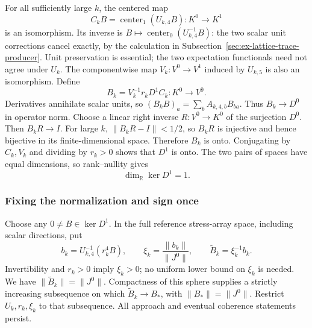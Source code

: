 For all sufficiently large $k$, the centered map
\[
 C_kB=\operatorname{center}_1(U_{k,4}B):K^0\longrightarrow K^1
\]
is an isomorphism. Its inverse is
$B\mapsto\operatorname{center}_0(U_{k,4}^{-1}B)$: the two scalar
unit corrections cancel exactly, by the calculation in
Subsection~\ref{sec:ex-lattice-trace-producer}. Unit preservation is
essential; the two expectation functionals need not agree under $U_k$.
The componentwise map $V_k:V^0\to V^1$ induced by $U_{k,5}$ is
also an isomorphism. Define
\[
       B_k=V_k^{-1}r_kD^1 C_k:K^0\longrightarrow V^0.
\]
Derivatives annihilate scalar units, so
$(B_kB)_a=\sum_b A_{k,4,b}B_{ba}$. Thus $B_k\to D^0$ in
operator norm. Choose a linear right inverse $R:V^0\to K^0$ of
the surjection $D^0$. Then $B_kR\to I$. For large $k$,
$\|B_kR-I\|<1/2$, so $B_kR$ is injective and hence bijective
in its finite-dimensional space. Therefore $B_k$ is onto.
Conjugating by $C_k,V_k$ and dividing by $r_k>0$ shows that $D^1$
is onto. The two pairs of spaces have equal dimensions, so
rank--nullity gives
\begin{equation}\label{eq:stress-physical-line}
                  \dim_{\mathbb R}\ker D^1=1.
\end{equation}

\subsubsection{Fixing the normalization and sign once}
Choose any $0\ne B\in\ker D^1$. In the full reference stress-array
space, including scalar directions, put
\[
 b_k=U_{k,4}^{-1}(r_k^4B),\qquad
 \xi_k=\frac{\|b_k\|}{\|J^0\|},\qquad
                       \widetilde B_k=\xi_k^{-1}b_k.
\]
Invertibility and $r_k>0$ imply $\xi_k>0$; no uniform lower bound
on $\xi_k$ is needed. We have
$\|\widetilde B_k\|=\|J^0\|$. Compactness of this sphere supplies
a strictly increasing subsequence on which $\widetilde B_k\to B_*$,
with $\|B_*\|=\|J^0\|$. Restrict $U_k,r_k,\xi_k$ to that
subsequence. All approach and eventual coherence statements persist.


